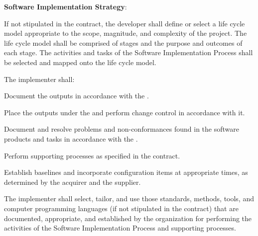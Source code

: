 			\begin{adjustwidth}{2em}{0pt} 

				\begin{compactenum}

					\item {\bf Software Implementation Strategy}:

					\begin{compactenum}

						\item If not stipulated in the contract, the developer shall define or select a life cycle model appropriate to the scope, magnitude, and complexity of the project. The life cycle model shall be comprised of stages and the purpose and outcomes of each stage. The activities and tasks of the Software Implementation Process shall be selected and mapped onto the life cycle model.

						\item The implementer shall:

						\begin{compactenum}

							\item Document the outputs in accordance with the .

							\item Place the outputs under the  and perform change control in accordance with it.

							\item Document and resolve problems and non-conformances found in the software products and tasks in accordance with the .

							\item Perform supporting processes as specified in the contract.

							\item Establish baselines and incorporate configuration items at appropriate times, as determined by the acquirer and the supplier.

						\end{compactenum}

						\item The implementer shall select, tailor, and use those standards, methods, tools, and computer programming languages (if not stipulated in the contract) that are documented, appropriate, and established by the organization for performing the activities of the Software Implementation Process and supporting processes.


\end{compactenum}
\end{compactenum}
\end{adjustwidth}
